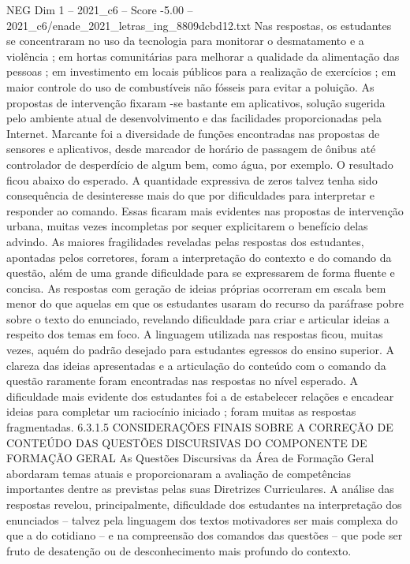 \begin{textsample}{NEG Dim 1 – 2021\_c6 – Score -5.00 – 2021\_c6/enade\_2021\_letras\_ing\_8809dcbd12.txt}
Nas respostas, os estudantes se concentraram no uso da tecnologia para monitorar o desmatamento e a violência ; em hortas comunitárias para melhorar a qualidade da alimentação das pessoas ; em investimento em locais públicos para a realização de exercícios ; em maior controle do uso de combustíveis não fósseis para evitar a poluição.
As propostas de intervenção fixaram -se bastante em aplicativos, solução sugerida pelo ambiente atual de desenvolvimento e das facilidades proporcionadas pela Internet.
Marcante foi a diversidade de funções encontradas nas propostas de sensores e aplicativos, desde marcador de horário de passagem de ônibus até controlador de desperdício de algum bem, como água, por exemplo.
O resultado ficou abaixo do esperado.
A quantidade expressiva de zeros talvez tenha sido consequência de desinteresse mais do que por dificuldades para interpretar e responder ao comando.
Essas ficaram mais evidentes nas propostas de intervenção urbana, muitas vezes incompletas por sequer explicitarem o benefício delas advindo.
As maiores fragilidades reveladas pelas respostas dos estudantes, apontadas pelos corretores, foram a interpretação do contexto e do comando da questão, além de uma grande dificuldade para se expressarem de forma fluente e concisa.
As respostas com geração de ideias próprias ocorreram em escala bem menor do que aquelas em que os estudantes usaram do recurso da paráfrase pobre sobre o texto do enunciado, revelando dificuldade para criar e articular ideias a respeito dos temas em foco.
A linguagem utilizada nas respostas ficou, muitas vezes, aquém do padrão desejado para estudantes egressos do ensino superior.
A clareza das ideias apresentadas e a articulação do conteúdo com o comando da questão raramente foram encontradas nas respostas no nível esperado.
A dificuldade mais evidente dos estudantes foi a de estabelecer relações e encadear ideias para completar um raciocínio iniciado ; foram muitas as respostas fragmentadas. 6.3.1.5 CONSIDERAÇÕES FINAIS SOBRE A CORREÇÃO DE CONTEÚDO DAS QUESTÕES DISCURSIVAS DO COMPONENTE DE FORMAÇÃO GERAL As Questões Discursivas da Área de Formação Geral abordaram temas atuais e proporcionaram a avaliação de competências importantes dentre as previstas pelas suas Diretrizes Curriculares.
A análise das respostas revelou, principalmente, dificuldade dos estudantes na interpretação dos enunciados – talvez pela linguagem dos textos motivadores ser mais complexa do que a do cotidiano – e na compreensão dos comandos das questões – que pode ser fruto de desatenção ou de desconhecimento mais profundo do contexto.

\end{textsample}
